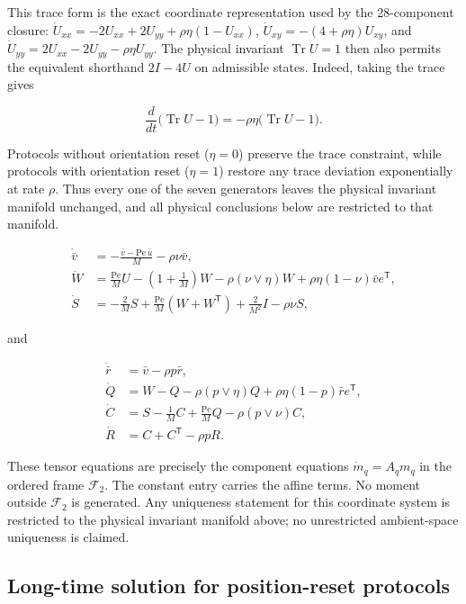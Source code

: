This trace form is the exact coordinate representation used by the 28-component closure: \(\dot U_{xx}=-2U_{xx}+2U_{yy}+\rho\eta(1-U_{xx})\), \(\dot U_{xy}=-(4+\rho\eta)U_{xy}\), and \(\dot U_{yy}=2U_{xx}-2U_{yy}-\rho\eta U_{yy}\). The physical invariant \(\operatorname{Tr}U=1\) then also permits the equivalent shorthand \(2I-4U\) on admissible states. Indeed, taking the trace gives

\[
\frac{d}{dt}\big(\operatorname{Tr}U-1\big)
=-\rho\eta\big(\operatorname{Tr}U-1\big).
\]

Protocols without orientation reset (\(\eta=0\)) preserve the trace constraint, while protocols with orientation reset (\(\eta=1\)) restore any trace deviation exponentially at rate \(\rho\). Thus every one of the seven generators leaves the physical invariant manifold unchanged, and all physical conclusions below are restricted to that manifold.

\[
\begin{aligned}
\dot{\bar v}
&=-\frac{\bar v-\mathrm{Pe}\,\bar u}{M}-\rho\nu\bar v,\\
\dot W
&=\frac{\mathrm{Pe}}{M}U-\left(1+\frac1M\right)W
-\rho(\nu\vee\eta)W
+\rho\eta(1-\nu)\bar v e^\mathsf T,\\
\dot S
&=-\frac{2}{M}S+\frac{\mathrm{Pe}}{M}(W+W^\mathsf T)
+\frac{2}{M^2}I-\rho\nu S,
\end{aligned}
\]

and

\[
\begin{aligned}
\dot{\bar r}
&=\bar v-\rho p\bar r,\\
\dot Q
&=W-Q-\rho(p\vee\eta)Q
+\rho\eta(1-p)\bar r e^\mathsf T,\\
\dot C
&=S-\frac1M C+\frac{\mathrm{Pe}}{M}Q
-\rho(p\vee\nu)C,\\
\dot R
&=C+C^\mathsf T-\rho pR.
\end{aligned}
\]

These tensor equations are precisely the component equations \(\dot m_q=A_qm_q\) in the ordered frame \(\mathcal F_2\). The constant entry carries the affine terms. No moment outside \(\mathcal F_2\) is generated. Any uniqueness statement for this coordinate system is restricted to the physical invariant manifold above; no unrestricted ambient-space uniqueness is claimed.

\subsection{Long-time solution for position-reset protocols}\label{s3.1-long-time-solution-for-position-reset-protocols}


